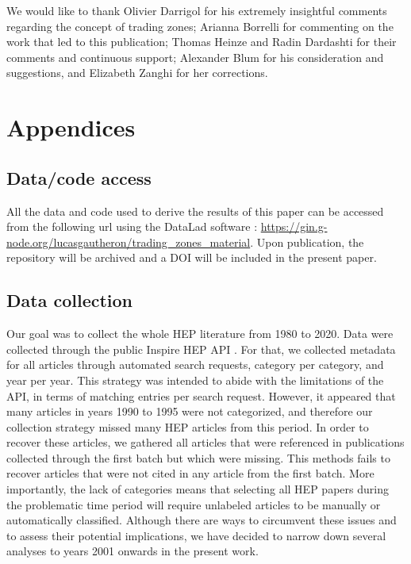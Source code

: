 \documentclass[smallextended]{svjour3}
\begin{document}
\begin{acknowledgements}
We would like to thank Olivier Darrigol for his extremely insightful comments regarding the concept of trading zones; Arianna Borrelli for commenting on the work that led to this publication; Thomas Heinze and  Radin Dardashti for their comments and continuous support; Alexander Blum for his consideration and suggestions, and Elizabeth Zanghi for her corrections.
\end{acknowledgements}




\appendix


\section{Appendices}
\label{section:appendix}

\subsection{Data/code access}
\label{appendix:data_access}

All the data and code used to derive the results of this paper can be accessed from the following url using the DataLad software \citep{datalad_paper}: \url{https://gin.g-node.org/lucasgautheron/trading_zones_material}. Upon publication, the repository will be archived and a DOI will be included in the present paper.

\subsection{Data collection}
\label{appendix:collection}

Our goal was to collect the whole HEP literature from 1980 to 2020. Data were collected through the public Inspire HEP API \citep{InspireAPI}. For that, we collected metadata for all articles through automated search requests, category per category, and year per year. This strategy was intended to abide with the limitations of the API, in terms of matching entries per search request. However, it appeared that many articles in years 1990 to 1995 were not categorized, and therefore our collection strategy missed many HEP articles from this period. In order to recover these articles, we gathered all articles that were referenced in publications collected through the first batch but which were missing. This methods fails to recover articles that were not cited in any article from the first batch. More importantly, 
the lack of categories means that selecting all HEP papers during the problematic time period will require unlabeled articles to be manually or automatically classified. Although there are ways to circumvent these issues and to assess their potential implications, we have decided to narrow down several analyses to years 2001 onwards in the present work.
\end{document}
